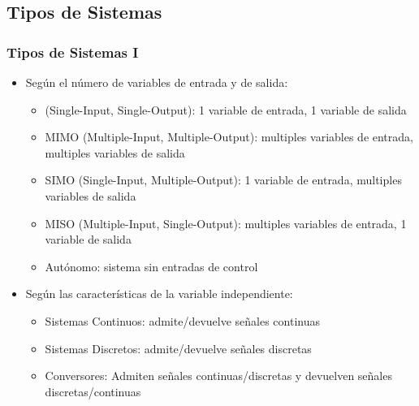 \subsection{Tipos de Sistemas}

\begin{frame}
  \frametitle{Tipos de Sistemas I}

  \vspace{-0,3cm}

  \begin{figure}
    \centering
    \small
  \end{figure}
  \vspace{-0,25cm}
  \begin{itemize}
    \item <1-> Seg\'{u}n el n\'{u}mero de variables de entrada y de salida:
    \begin{itemize}
      \item \color{olivegreen}{SISO }\color{black}  (Single-Input, Single-Output): 1 variable de entrada, 1 variable de salida
      \item \alert{MIMO} (Multiple-Input, Multiple-Output): multiples variables de entrada, multiples variables de salida
      \item \alert{SIMO} (Single-Input, Multiple-Output): 1 variable de entrada, multiples variables de salida
      \item \alert{MISO} (Multiple-Input, Single-Output): multiples variables de entrada, 1 variable de salida
      \item \alert{Aut\'{o}nomo}:  sistema sin entradas de control
    \end{itemize}

    \item <2-> Según las características de la variable independiente:
    \begin{itemize}
      \item \alert{Sistemas Continuos}: admite/devuelve señales continuas
      \item \alert{Sistemas Discretos}: admite/devuelve señales discretas
      \item \alert{Conversores}: Admiten señales continuas/discretas y devuelven señales discretas/continuas
    \end{itemize}
  \end{itemize}

  \vspace{-0.4cm}

\end{frame}

